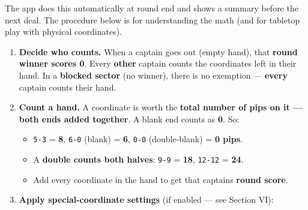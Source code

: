 \documentclass[11pt]{article}
\providecommand{\tightlist}{%
  \setlength{\itemsep}{0pt}\setlength{\parskip}{0pt}}
\begin{document}
The app does this automatically at round end and shows a summary before
the next deal. The procedure below is for understanding the math (and
for tabletop play with physical coordinates).

\begin{enumerate}
\def\labelenumi{\arabic{enumi}.}
\tightlist
\item
  \textbf{Decide who counts.} When a captain goes out (empty hand), that
  \textbf{round winner scores 0}. Every \textbf{other} captain counts
  the coordinates left in their hand. In a \textbf{blocked sector} (no
  winner), there is no exemption --- \textbf{every} captain counts their
  hand.
\item
  \textbf{Count a hand.} A coordinate is worth the \textbf{total number of
  pips on it --- both ends added together}. A blank end counts as
  \textbf{0}. So:

  \begin{itemize}
  \tightlist
  \item
    \texttt{5-3} = \textbf{8}, \texttt{6-0} (blank) = \textbf{6},
    \texttt{0-0} (double-blank) = \textbf{0 pips}.
  \item
    A \textbf{double counts both halves}: \texttt{9-9} = \textbf{18},
    \texttt{12-12} = \textbf{24}.
  \item
    Add every coordinate in the hand to get that captain\textquotesingle s
    \textbf{round score}.
  \end{itemize}
\item
  \textbf{Apply special-coordinate settings} (if enabled --- see Section VI):


\end{enumerate}
\end{document}
